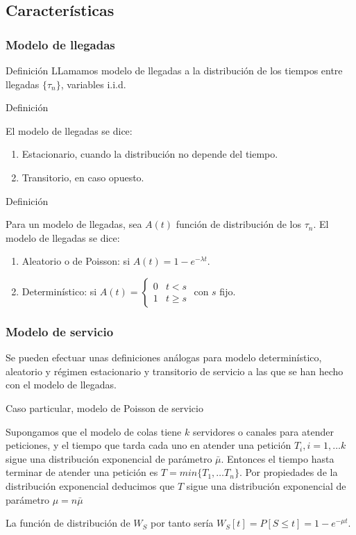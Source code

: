 \documentclass[8pt]{beamer}
\begin{document}
  \subsection{Características}
  \begin{frame}\frametitle{Modelo de llegadas}
    \begin{block}{Definición}
    LLamamos modelo de llegadas a la distribución de los tiempos entre llegadas $\{\tau_n\}$, variables i.i.d.
    \end{block}
    \begin{block}{Definición}

    El modelo de llegadas se dice:
 
    \begin{enumerate}
    \item Estacionario, cuando la distribución no depende del tiempo.
    \item Transitorio, en caso opuesto.
    \end{enumerate}
    \end{block}
    \begin{block}{Definición}

      Para un modelo de llegadas, sea $A(t)$ función de distribución de los $\tau_n$.
      El modelo de llegadas se dice:

      \begin{enumerate}
      \item Aleatorio o de Poisson: si $A(t) = 1 - e^{-\lambda t}$.
      \item Determinístico: si $A(t) = \left\{\begin{array}{ll}
        0 & t<s \\
        1 & t\ge s
      \end{array}\right.$ con $s$ fijo.

      \end{enumerate}
    \end{block}
  \end{frame}
  \begin{frame}\frametitle{Modelo de servicio}
    Se pueden efectuar unas definiciones análogas para modelo determinístico, aleatorio y régimen estacionario y transitorio
    de servicio a las que se han hecho con el modelo de llegadas.

    \begin{block}{Caso particular, modelo de Poisson de servicio}

      Supongamos que el modelo de colas tiene $k$ servidores o canales para atender peticiones, y el tiempo que 
      tarda cada uno en atender una petición $T_i, i=1,\ldots k$ sigue una distribución exponencial de parámetro $\bar{\mu}$.
      Entonces el tiempo hasta terminar de atender una petición es $T = min\{T_1, \ldots T_n\}$. Por propiedades de la
      distribución exponencial deducimos que $T$ sigue una distribución exponencial de parámetro $\mu = n \bar{\mu}$
      
      La función de distribución de $W_S$ por tanto sería $W_S[t] = P[S\le t] = 1 - e^{-\mu t}$.

    \end{block}


  \end{frame}
\end{document}
